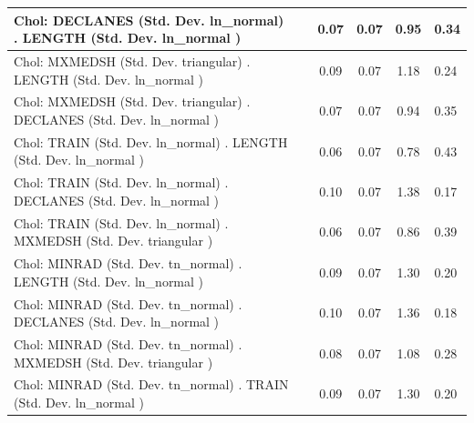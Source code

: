 \begin{table}
\begin{center}
\begin{tabular}{|l|l|c|c|c|l|}
			\hline
			 Chol: DECLANES (Std. Dev. ln_normal) . LENGTH (Std. Dev.   ln_normal ) &  & 0.07 & 0.07 & 0.95 & 0.34 \\
			\hline
			 Chol: MXMEDSH (Std. Dev. triangular) . LENGTH (Std. Dev.   ln_normal ) &  & 0.09 & 0.07 & 1.18 & 0.24 \\
			\hline
			 Chol: MXMEDSH (Std. Dev. triangular) . DECLANES (Std. Dev.   ln_normal ) &  & 0.07 & 0.07 & 0.94 & 0.35 \\
			\hline
			 Chol: TRAIN (Std. Dev. ln_normal) . LENGTH (Std. Dev.   ln_normal ) &  & 0.06 & 0.07 & 0.78 & 0.43 \\
			\hline
			 Chol: TRAIN (Std. Dev. ln_normal) . DECLANES (Std. Dev.   ln_normal ) &  & 0.10 & 0.07 & 1.38 & 0.17 \\
			\hline
			 Chol: TRAIN (Std. Dev. ln_normal) . MXMEDSH (Std. Dev.   triangular ) &  & 0.06 & 0.07 & 0.86 & 0.39 \\
			\hline
			 Chol: MINRAD (Std. Dev. tn_normal) . LENGTH (Std. Dev.   ln_normal ) &  & 0.09 & 0.07 & 1.30 & 0.20 \\
			\hline
			 Chol: MINRAD (Std. Dev. tn_normal) . DECLANES (Std. Dev.   ln_normal ) &  & 0.10 & 0.07 & 1.36 & 0.18 \\
			\hline
			 Chol: MINRAD (Std. Dev. tn_normal) . MXMEDSH (Std. Dev.   triangular ) &  & 0.08 & 0.07 & 1.08 & 0.28 \\
			\hline
			 Chol: MINRAD (Std. Dev. tn_normal) . TRAIN (Std. Dev.   ln_normal ) &  & 0.09 & 0.07 & 1.30 & 0.20 \\
			\hline
		\end{tabular}
	\end{center}
\end{table}